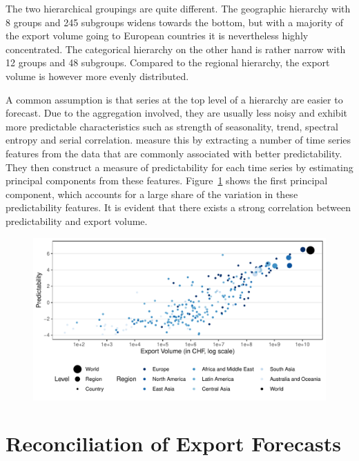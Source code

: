 \documentclass[a4paper,fleqn,11pt]{article}
\begin{document}
The two hierarchical groupings are quite different. The geographic hierarchy with 8 groups and 245 subgroups widens towards the bottom, but with a majority of the export volume going to European countries it is nevertheless highly concentrated. The categorical hierarchy on the other hand is rather narrow with 12 groups and 48 subgroups. Compared to the regional hierarchy, the export volume is however more evenly distributed.

A common assumption is that series at the top level of a hierarchy are easier to forecast. Due to the aggregation involved, they are usually less noisy and exhibit more predictable characteristics such as strength of seasonality, trend, spectral entropy and serial correlation. \cite{Kang2017} measure this by extracting a number of time series features from the data that are commonly associated with better predictability. They then construct a measure of predictability for each time series by estimating principal components from these features. Figure~\ref{fig:feature} shows the first principal component, which accounts for a large share of the variation in these predictability features. It is evident that there exists a strong correlation between predictability and export volume.

\begin{figure}[H]
	\includegraphics[width=\textwidth]{fig/fig_confetti}
	\label{fig:feature}
\end{figure}


\section{Reconciliation of Export Forecasts}\label{sec:appl}
\end{document}
